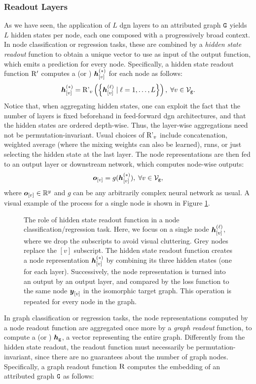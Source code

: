 \subsubsection*{Readout Layers}
As we have seen, the application of $L$ \gls{dgn} layers to an attributed graph $\AttrGraph{G}$ yields $L$ hidden states per node, each one composed with a progressively broad context. In node classification or regression tasks, these are combined by a \emph{hidden state readout} function to obtain a unique vector to use as input of the output function, which emits a prediction for every node. Specifically, a hidden state readout function $\mathrm{R'}$ computes a  (or ) $\StateVector{v}{*}$ for each node as follows:
$$\StateVector{v}{*} = \Op{R'}_{v}\Par{\Set{\StateVector{v}{\ell} \mid \ell = 1, \ldots, L}},\;  \forall v \in \Nodes{g}. $$
Notice that, when aggregating hidden states, one can exploit the fact that the number of layers is fixed beforehand in feed-forward \gls{dgn} architectures, and that the hidden states are ordered depth-wise. Thus, the layer-wise aggregations need not be permutation-invariant. Usual choices of $\operatorname{R'}_{v}$ include concatenation, weighted average (where the mixing weights can also be learned), \gls{rnn}s, or just selecting the hidden state at the last layer. The node representations are then fed to an output layer or downstream network, which computes node-wise outputs:
$$\Elem{o}{v} = g(\StateVector{v}{*}),\; \forall v \in \Nodes{g},$$
where $\Elem{o}{v} \in \Real^y$ and $g$ can be any arbitrarily complex neural network as usual. A visual example of the process for a single node is shown in Figure \ref{fig:node-readout}.
\begin{figure*}[h!]
    \centering
    \resizebox{.8\textwidth}{!}{}
    \caption{The role of hidden state readout function in a node classification/regression task. Here, we focus on a single node $\StateVector{v}{\ell}$, where we drop the subscripts to avoid visual cluttering. Grey nodes replace the $[v]$ subscript. The hidden state readout function creates a node representation $\StateVector{v}{*}$ by combining its three hidden states (one for each layer). Successively, the node representation is turned into an output by an output layer, and compared by the loss function to the same node $\Elem{y}{v}$ in the isomorphic target graph. This operation is repeated for every node in the graph.}
    \label{fig:node-readout}
\end{figure*}
In graph classification or regression tasks, the node representations computed by a node readout function are aggregated once more by a \emph{graph readout} function, to compute a  (or ) $\GraphRepr{g}$, \ie a vector representing the entire graph. Differently from the hidden state readout, the readout function must necessarily be permutation-invariant, since there are no guarantees about the number of graph nodes. Specifically, a graph readout function $\mathrm{R}$ computes the embedding of an attributed graph $\AttrGraph{g}$ as follows:
